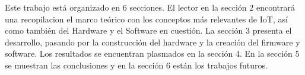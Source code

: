 Este trabajo está organizado en 6 secciones. El lector en la sección 2 encontrará una recopilacion el marco teórico con los conceptos más relevantes de IoT, así como también del Hardware y el Software en cuestión. La sección 3 presenta el desarrollo, pasando por la construcción del hardware y la creación del firmware y software. Los resultados se encuentran plasmados en la sección 4. En la sección 5 se muestran las conclusiones y en la sección 6 están los trabajos futuros.
 
 
